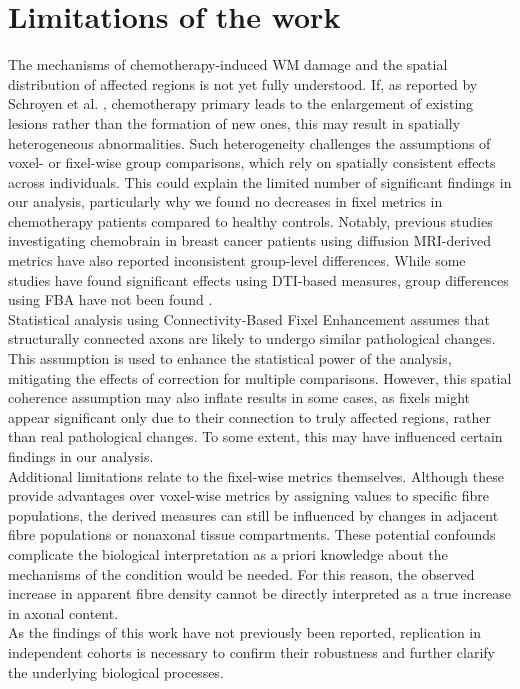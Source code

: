 \section{Limitations of the work}
The mechanisms of chemotherapy-induced WM damage and the spatial distribution of affected regions is not yet fully understood. If, as reported by Schroyen et al. \cite{Schroyen2023}, chemotherapy primary leads to the enlargement of existing lesions rather than the formation of new ones, this may result in spatially heterogeneous abnormalities. Such heterogeneity challenges the assumptions of voxel- or fixel-wise group comparisons, which rely on spatially consistent effects across individuals. This could explain the limited number of significant findings in our analysis, particularly why we found no decreases in fixel metrics in chemotherapy patients compared to healthy controls. Notably, previous studies investigating chemobrain in breast cancer patients using diffusion MRI-derived metrics have also reported inconsistent group-level differences. While some studies have found significant effects using DTI-based measures, group differences using FBA have not been found \cite{Deprez2011, Schroyen2021}.
\\Statistical analysis using Connectivity-Based Fixel Enhancement assumes that structurally connected axons are likely to undergo similar pathological changes. This assumption is used to enhance the statistical power of the analysis, mitigating the effects of correction for multiple comparisons. However, this spatial coherence assumption may also inflate results in some cases, as fixels might appear significant only due to their connection to truly affected regions, rather than real pathological changes. To some extent, this may have influenced certain findings in our analysis.
\\Additional limitations relate to the fixel-wise metrics themselves. Although these provide advantages over voxel-wise metrics by assigning values to specific fibre populations, the derived measures can still be influenced by changes in adjacent fibre populations or nonaxonal tissue compartments. These potential confounds complicate the biological interpretation as a priori knowledge about the mechanisms of the condition would be needed. For this reason, the observed increase in apparent fibre density cannot be directly interpreted as a true increase in axonal content.
\\ As the findings of this work have not previously been reported, replication in independent cohorts is necessary to confirm their robustness and further clarify the underlying biological processes.

